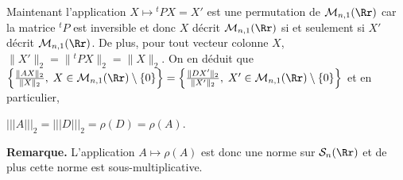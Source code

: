 {{Maintenant l'application $X\mapsto{^t}PX=X'$ est une permutation de $\mathcal{M}_{n,1}(\Rr)$ car la matrice ${^t}P$ est inversible et donc $X$ décrit $\mathcal{M}_{n,1}(\Rr)$ si et seulement si $X'$ décrit $\mathcal{M}_{n,1}(\Rr)$. De plus, pour tout vecteur colonne $X$, $\|X'\|_2=\|{^t}PX\|_2=\|X\|_2$. On en déduit que $\left\{
 \frac{\|AX\|_2}{\|X\|_2},\;X\in\mathcal{M}_{n,1}(\Rr)\setminus\{0\}\right\}=\left\{
 \frac{\|DX'\|_2}{\|X'\|_2},\;X'\in\mathcal{M}_{n,1}(\Rr)\setminus\{0\}\right\}$ et en particulier,

\begin{center}
$|||A|||_2=|||D|||_2=\rho(D)=\rho(A)$.
\end{center}

\begin{center}
\end{center}

\textbf{Remarque.} L'application $A\mapsto\rho(A)$ est donc une norme sur $\mathcal{S}_n(\Rr)$ et de plus cette norme est sous-multiplicative.
}
}
